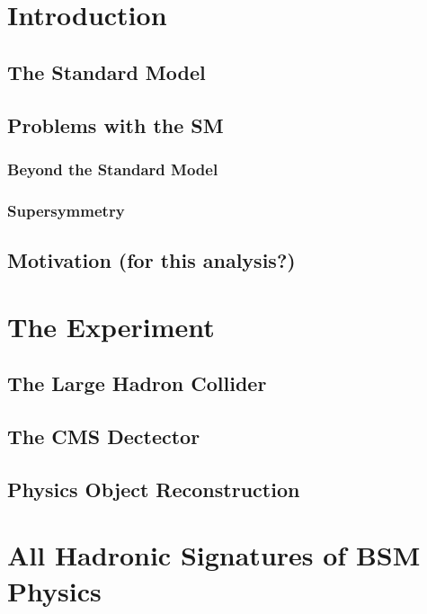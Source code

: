 \chapter{Introduction}  \label{ch:intro} %
\section{The Standard Model}
\section{Problems with the SM}
\subsection{Beyond the Standard Model}
\subsection{Supersymmetry}
\section{Motivation (for this analysis?)}

\chapter{The Experiment}
\section{The Large Hadron Collider}
\section{The CMS Dectector}
\section{Physics Object Reconstruction}

\chapter{All Hadronic Signatures of BSM Physics}

